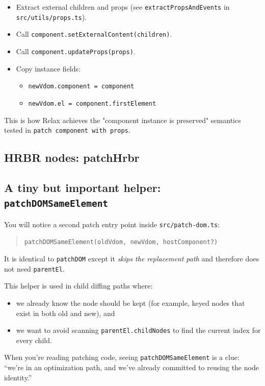 \begin{itemize}
  \item Extract external children and props (see \texttt{extractPropsAndEvents} in \texttt{src/utils/props.ts}).
  \item Call \texttt{component.setExternalContent(children)}.
  \item Call \texttt{component.updateProps(props)}.
  \item Copy instance fields:
    \begin{itemize}
      \item \texttt{newVdom.component = component}
      \item \texttt{newVdom.el = component.firstElement}
    \end{itemize}
\end{itemize}

This is how Relax achieves the "component instance is preserved" semantics tested in \texttt{patch component with props}.

\subsection{HRBR nodes: patchHrbr}

\subsection{A tiny but important helper: \texttt{patchDOMSameElement}}
You will notice a second patch entry point inside \texttt{src/patch-dom.ts}:

\begin{quote}
    \texttt{patchDOMSameElement(oldVdom, newVdom, hostComponent?)}
\end{quote}

It is identical to \texttt{patchDOM} except it \emph{skips the replacement path} and therefore does not need \texttt{parentEl}.

This helper is used in child diffing paths where:

\begin{itemize}
  \item we already know the node should be kept (for example, keyed nodes that exist in both old and new), and
  \item we want to avoid scanning \texttt{parentEl.childNodes} to find the current index for every child.
\end{itemize}

When you're reading patching code, seeing \texttt{patchDOMSameElement} is a clue: ``we're in an optimization path, and we've already committed to reusing the node identity.''

